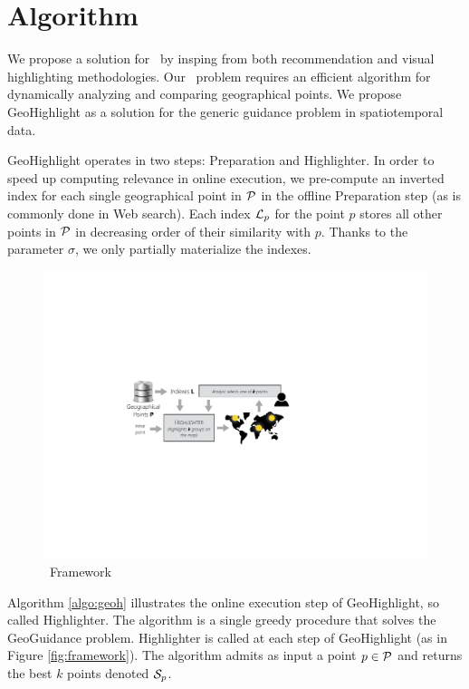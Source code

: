 \section{Algorithm}
\label{sec:algo}
We propose a solution for \pb\ by insping from both recommendation \cite{Omidvar-Tehrani:2015} and
visual highlighting \cite{Lohmann:2012,Robinson2011,Liang2010} methodologies. Our \pb\ problem requires an efficient algorithm for dynamically analyzing and comparing geographical points. We propose {\sc GeoHighlight} as a solution for the generic guidance problem in spatiotemporal data. 

{\sc GeoHighlight} operates in two steps: {\sc Preparation} and {\sc Highlighter}. In order to speed up computing relevance in online execution, we pre-compute an inverted index for each single geographical point in ${\cal P}$ in the offline {\sc Preparation} step (as is commonly done in Web search). Each index ${\cal L}_p$ for the point $p$ stores all other points in ${\cal P}$ in decreasing order of their similarity with $p$. Thanks to the parameter $\sigma$, we only partially materialize the indexes.


\begin{figure}
  \centering
  \includegraphics[width=\columnwidth]{figs/framework}
\caption{\framework\ Framework}
\label{fig:framwork}
\end{figure}

Algorithm \ref{algo:geoh} illustrates the online execution step of {\sc GeoHighlight}, so called {\sc Highlighter}. The algorithm is a single greedy procedure that solves the {\sc GeoGuidance} problem. {\sc Highlighter} is called at each step of {\sc GeoHighlight} (as in Figure \ref{fig:framework}). The algorithm admits as input a point $p \in {\cal P}$ and returns the best $k$ points denoted ${\cal S}_p$.

